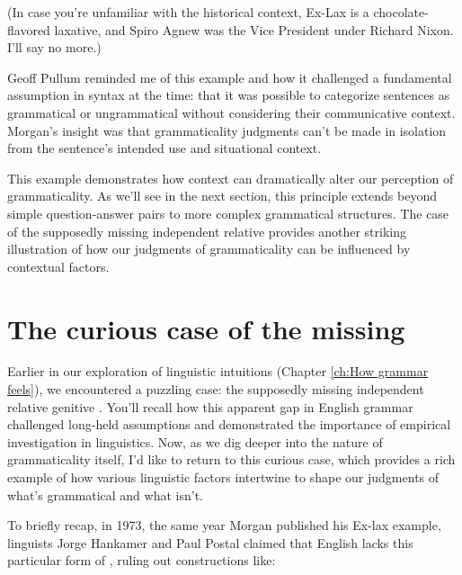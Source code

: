 (In case you're unfamiliar with the historical context, Ex-Lax is a chocolate-flavored laxative, and Spiro Agnew was the Vice President under Richard Nixon. I'll say no more.)

Geoff Pullum reminded me of this example and how it challenged a fundamental assumption in syntax at the time: that it was possible to categorize sentences as grammatical or ungrammatical without considering their communicative context. Morgan's insight was that grammaticality judgments can't be made in isolation from the sentence's intended use and situational context.

This example demonstrates how context can dramatically alter our perception of grammaticality. As we'll see in the next section, this principle extends beyond simple question-answer pairs to more complex grammatical structures. The case of the supposedly missing independent relative  provides another striking illustration of how our judgments of grammaticality can be influenced by contextual factors.

\section{The curious case of the missing }

Earlier in our exploration of linguistic intuitions (Chapter \ref{ch:How grammar feels}), we encountered a puzzling case: the supposedly missing independent relative genitive . You'll recall how this apparent gap in English grammar challenged long-held assumptions and demonstrated the importance of empirical investigation in linguistics. Now, as we dig deeper into the nature of grammaticality itself, I'd like to return to this curious case, which provides a rich example of how various linguistic factors intertwine to shape our judgments of what's grammatical and what isn't.

To briefly recap, in 1973, the same year Morgan published his Ex-lax example, linguists Jorge Hankamer and Paul Postal claimed that English lacks this particular form of , ruling out constructions like:

\z

